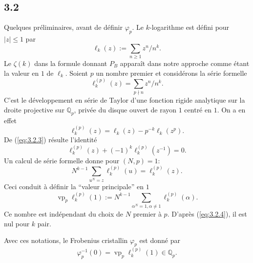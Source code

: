 \documentclass[12pt,a4paper]{article}
\theoremstyle{plain}
\theoremstyle{definition}
\theoremstyle{remark}
\begin{document}
\subsection*{3.2}

Quelques pr\'eliminaires, avant de d\'efinir $\varphi_p$. Le $k$-logarithme est
d\'efini pour $|z| \leq 1$ par
\begin{equation}\label{eq:3.2.1}
\ell_k(z) := \sum_{n \geq 1} z^n/n^k.
\end{equation}
Le $\zeta(k)$ dans la formule donnant $P_B$ appara\^it dans notre approche comme \'etant
la valeur en $1$ de $\ell_k$. Soient $p$ un nombre premier et consid\'erons la s\'erie
formelle
\begin{equation}\label{eq:3.2.2}
\ell_k^{(p)}(z) = \sum_{p \nmid n} z^n/n^k.
\end{equation}
C'est le d\'eveloppement en s\'erie de Taylor d'une fonction rigide analytique sur la
droite projective sur $\mathbb{Q}_p$, priv\'ee du disque ouvert de rayon $1$ centr\'e en
$1$. On a en effet
\begin{equation}\label{eq:3.2.3}
\ell_k^{(p)}(z) = \ell_k(z) - p^{-k} \ell_k(z^p).
\end{equation}
De (\ref{eq:3.2.3}) r\'esulte l'identit\'e
\begin{equation}\label{eq:3.2.4}
\ell_k^{(p)}(z) + (-1)^k \ell_k^{(p)}(z^{-1}) = 0.
\end{equation}
Un calcul de s\'erie formelle donne pour $(N,p) = 1$:
\begin{equation}\label{eq:3.2.5}
N^{k-1} \sum_{u^N=z} \ell_k^{(p)}(u) = \ell_k^{(p)}(z).
\end{equation}
Ceci conduit \`a d\'efinir la ``valeur principale'' en $1$
\begin{equation}\label{eq:3.2.6}
\operatorname{vp}_p \ell_k^{(p)}(1) := N^{k-1} \sum_{\alpha^N=1, \alpha \neq 1} \ell_k^{(p)}(\alpha).
\end{equation}
Ce nombre est ind\'ependant du choix de $N$ premier \`a $p$. D'apr\`es
(\ref{eq:3.2.4}), il est nul pour $k$ pair.

Avec ces notations, le Frobenius cristallin $\varphi_p$ est donn\'e par
\begin{equation}\label{eq:3.2.7}
\varphi_p^{-1}(0) = \operatorname{vp}_p \ell_k^{(p)}(1) \in \mathbb{Q}_p.
\end{equation}
\end{document}
